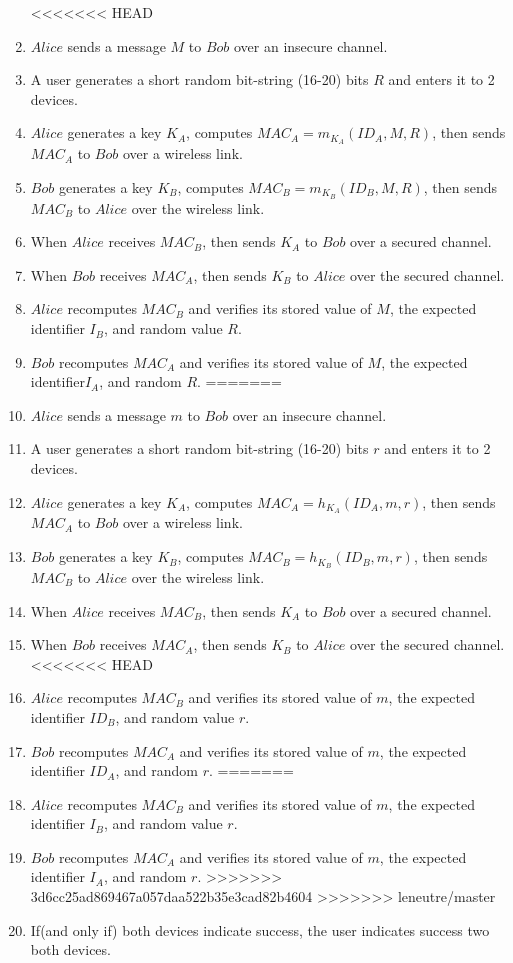 \begin{enumerate}
<<<<<<< HEAD
\item $Alice$ sends a message $M$ to $Bob$ over an insecure channel. 
\item A user generates a short random bit-string (16-20) bits $R$ and enters it to 2 devices.
\item $Alice$ generates a key $K_A$, computes $MAC_A = m_{K_A}(ID_A,M,R)$, then sends $MAC_A$ to $Bob$ over a wireless link.
\item $Bob$ generates a key $K_B$, computes $MAC_B = m_{K_B}(ID_B,M,R)$, then sends $MAC_B$ to $Alice$ over the wireless link.
\item When $Alice$ receives $MAC_B$, then sends $K_A$ to $Bob$ over a secured channel.
\item When $Bob$ receives $MAC_A$, then sends $K_B$ to $Alice$ over the secured channel.
\item $Alice$ recomputes $MAC_B$ and verifies its stored value of $M$, the expected identifier $I_B$, and random value $R$.
\item $Bob$ recomputes $MAC_A$ and verifies its stored value of $M$, the expected identifier$I_A$, and random $R$.
=======
\item $Alice$ sends a message $m$ to $Bob$ over an insecure channel. 
\item A user generates a short random bit-string (16-20) bits $r$ and enters it to 2 devices.
\item $Alice$ generates a key $K_A$, computes $MAC_A = h_{K_A}(ID_A,m,r)$, then sends $MAC_A$ to $Bob$ over a wireless link.
\item $Bob$ generates a key $K_B$, computes $MAC_B = h_{K_B}(ID_B,m,r)$, then sends $MAC_B$ to $Alice$ over the wireless link.
\item When $Alice$ receives $MAC_B$, then sends $K_A$ to $Bob$ over a secured channel.
\item When $Bob$ receives $MAC_A$, then sends $K_B$ to $Alice$ over the secured channel.
<<<<<<< HEAD
\item $Alice$ recomputes $MAC_B$ and verifies its stored value of $m$, the expected identifier $ID_B$, and random value $r$.
\item $Bob$ recomputes $MAC_A$ and verifies its stored value of $m$, the expected identifier $ID_A$, and random $r$.
=======
\item $Alice$ recomputes $MAC_B$ and verifies its stored value of $m$, the expected identifier $I_B$, and random value $r$.
\item $Bob$ recomputes $MAC_A$ and verifies its stored value of $m$, the expected identifier $I_A$, and random $r$.
>>>>>>> 3d6cc25ad869467a057daa522b35e3cad82b4604
>>>>>>> leneutre/master
\item If(and only if) both devices indicate success, the user indicates success two both devices.
\end{enumerate}


